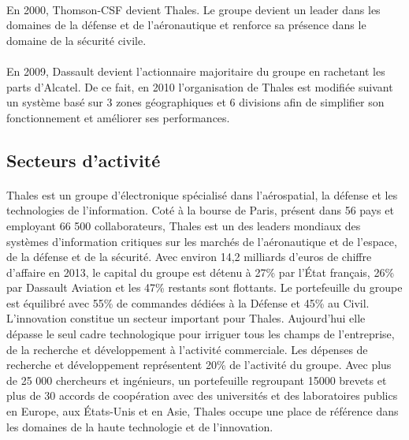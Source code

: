 \paragraph{} En 2000, Thomson-CSF devient Thales. Le groupe devient un leader dans les domaines de la d\'efense et de l’a\'eronautique et renforce sa pr\'esence dans le domaine de la s\'ecurit\'e civile.

\paragraph{} En 2009, Dassault devient l’actionnaire majoritaire du groupe en rachetant les parts d’Alcatel. De ce fait, en 2010 l’organisation de Thales est modifi\'ee suivant un système bas\'e sur 3 zones g\'eographiques et 6 divisions afin de simplifier son fonctionnement et am\'eliorer ses performances.

\subsection{Secteurs d’activit\'e}

\paragraph{} Thales est un groupe d’\'electronique sp\'ecialis\'e dans l’a\'erospatial, la d\'efense et les technologies de l’information. Cot\'e à la bourse de Paris, pr\'esent dans 56 pays et employant 66 500 collaborateurs, Thales est un des leaders mondiaux des systèmes d’information critiques sur les march\'es de l’a\'eronautique et de l’espace, de la d\'efense et de la s\'ecurit\'e. Avec environ 14,2 milliards d’euros de chiffre d’affaire en 2013, le capital du groupe est d\'etenu à 27\% par l’État français, 26\% par Dassault Aviation et les 47\% restants sont flottants. Le portefeuille du groupe est \'equilibr\'e avec 55\% de commandes d\'edi\'ees à la D\'efense et 45\% au Civil. L’innovation constitue un secteur important pour Thales. Aujourd’hui elle d\'epasse le seul cadre technologique pour irriguer tous les champs de l’entreprise, de la recherche et d\'eveloppement à l’activit\'e commerciale.  Les d\'epenses de recherche et d\'eveloppement repr\'esentent 20\% de l'activit\'e du groupe. Avec plus de 25 000 chercheurs et ing\'enieurs, un portefeuille regroupant 15000 brevets et plus de 30 accords de coop\'eration avec des universit\'es et des laboratoires publics en Europe, aux États-Unis et en Asie, Thales occupe une place de r\'ef\'erence dans les domaines de la haute technologie et de l’innovation.

